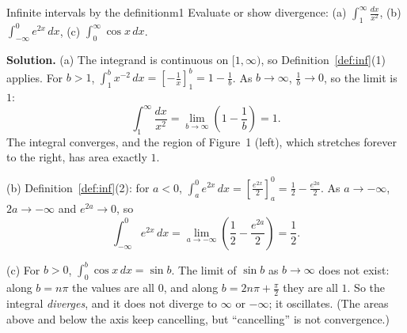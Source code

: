 \documentclass[11pt]{article}
\begin{document}
\begin{exmp}{Infinite intervals by the definition}{m1}
Evaluate or show divergence: (a) $\displaystyle\int_1^\infty\frac{dx}{x^2}$, \quad (b) $\displaystyle\int_{-\infty}^0e^{2x}\,dx$, \quad (c) $\displaystyle\int_0^\infty\cos x\,dx$.

\textbf{Solution.} (a) The integrand is continuous on $[1,\infty)$, so Definition~\ref{def:inf}(1) applies. For $b>1$, $\int_1^bx^{-2}\,dx=\left[-\frac1x\right]_1^b=1-\frac1b$. As $b\to\infty$, $\frac1b\to0$, so the limit is $1$:
\[\int_1^\infty\frac{dx}{x^2}=\lim_{b\to\infty}\left(1-\frac1b\right)=1 .\]
The integral converges, and the region of Figure~1 (left), which stretches forever to the right, has area exactly $1$.

(b) Definition~\ref{def:inf}(2): for $a<0$, $\int_a^0e^{2x}\,dx=\left[\frac{e^{2x}}2\right]_a^0=\frac12-\frac{e^{2a}}2$. As $a\to-\infty$, $2a\to-\infty$ and $e^{2a}\to0$, so
\[\int_{-\infty}^0e^{2x}\,dx=\lim_{a\to-\infty}\left(\frac12-\frac{e^{2a}}2\right)=\frac12 .\]

(c) For $b>0$, $\int_0^b\cos x\,dx=\sin b$. The limit of $\sin b$ as $b\to\infty$ does not exist: along $b=n\pi$ the values are all $0$, and along $b=2n\pi+\frac\pi2$ they are all $1$. So the integral \emph{diverges}, and it does not diverge to $\infty$ or $-\infty$; it oscillates. (The areas above and below the axis keep cancelling, but ``cancelling'' is not convergence.)
\end{exmp}
\end{document}
